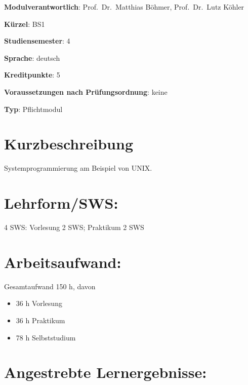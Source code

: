 \begin{modulHead}
\textbf{Modulverantwortlich}: Prof.~Dr.~Matthias
Böhmer, Prof.~Dr.~Lutz
Köhler
\end{modulHead}
\begin{modulHead}
\textbf{Kürzel}:
BS1
\end{modulHead}
\begin{modulHead}
\textbf{Studiensemester}:
4
\end{modulHead}
\begin{modulHead}
\textbf{Sprache}:
deutsch
\end{modulHead}
\begin{modulHead}
\textbf{Kreditpunkte}:
5
\end{modulHead}
\begin{modulHead}
\textbf{Voraussetzungen nach
Prüfungsordnung}: keine
\end{modulHead}
\begin{modulHead}
\textbf{Typ}:
Pflichtmodul
\end{modulHead}


\section*{Kurzbeschreibung}\label{kurzbeschreibung-1}

Systemprogrammierung am Beispiel von UNIX.

\section*{Lehrform/SWS:}\label{lehrformsws-5}

4 SWS: Vorlesung 2 SWS; Praktikum 2 SWS

\section*{Arbeitsaufwand:}\label{arbeitsaufwand-5}

Gesamtaufwand 150 h, davon

\begin{itemize}
\tightlist
\item
  36 h Vorlesung
\item
  36 h Praktikum
\item
  78 h Selbststudium
\end{itemize}

\section*{Angestrebte
Lernergebnisse:}\label{angestrebte-lernergebnisse-5}

